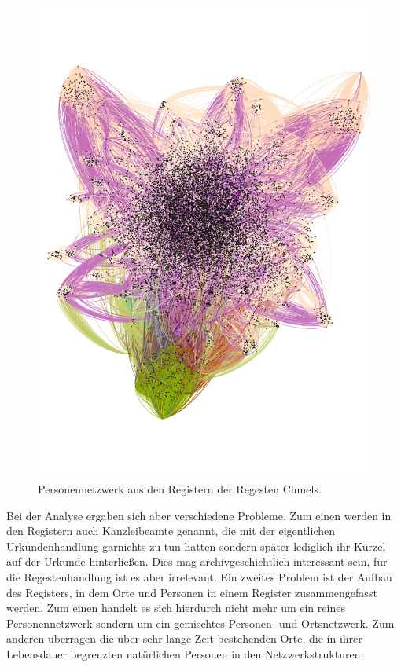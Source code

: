 \documentclass[ngerman,]{scrreprt}
\begin{document}
\begin{figure}
\centering
\includegraphics{Bilder/Chmelvisualisierung-v2.png}
\caption{Personennetzwerk aus den Registern der Regesten Chmels.}
\end{figure}

Bei der Analyse ergaben sich aber verschiedene Probleme. Zum einen werden in den Registern auch Kanzleibeamte genannt, die mit der eigentlichen Urkundenhandlung garnichts zu tun hatten sondern später lediglich ihr Kürzel auf der Urkunde hinterließen. Dies mag archivgeschichtlich interessant sein, für die Regestenhandlung ist es aber irrelevant. Ein zweites Problem ist der Aufbau des Registers, in dem Orte und Personen in einem Register zusammengefasst werden. Zum einen handelt es sich hierdurch nicht mehr um ein reines Personennetzwerk sondern um ein gemischtes Personen- und Ortsnetzwerk. Zum anderen überragen die über sehr lange Zeit bestehenden Orte, die in ihrer Lebensdauer begrenzten natürlichen Personen in den Netzwerkstrukturen.
\end{document}
